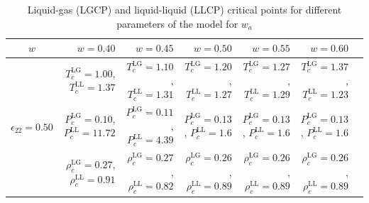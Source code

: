 \documentclass[9pt,twocolumn,twoside,lineno]{pnas-new}
\begin{document}
\begin{table}[h!]
\caption{Liquid-gas (LGCP) and liquid-liquid (LLCP) critical points for different parameters of the model for $w_a$}
\centering
\begin{tabular}{ |c||r|r|r|r|r|r| } 
 \hline
    $w$ & $w=0.40$ & $w = 0.45$ & $w = 0.50$ & $w = 0.55$ & $w = 0.60$ \\
    
  \hline
  \hline
 \multirow{3}{4em}{$\epsilon_{22}=0.50$}
 &   $T_c^\text{LG}=1.00$, $T_c^\text{LL}=1.37$  
 &   $T_c^\text{LG}=1.10$, $T_c^\text{LL}=1.31$  
 &   $T_c^\text{LG}=1.20$,  $T_c^\text{LL}=1.27$ 
 &   $T_c^\text{LG}=1.27$,  $T_c^\text{LL}=1.29$
 &   $T_c^\text{LG}=1.37$,  $T_c^\text{LL}=1.23$\\
 &  $P_c^\text{LG}=0.10$, $P_c^\text{LL}=11.72$ 
 & $P_c^\text{LG}=0.11$, $P_c^\text{LL}=4.39$  
 & $P_c^\text{LG}=0.13$, $P_c^\text{LL}=1.6$
 & $P_c^\text{LG}=0.13$, $P_c^\text{LL}=1.6$
 & $P_c^\text{LG}=0.13$, $P_c^\text{LL}=1.6$\\
 & $\rho_c^\text{LG}=0.27$, $\rho_c^\text{LL}=0.91$ &  $\rho_c^\text{LG}=0.27$, $\rho_c^\text{LL}=0.82$ &  $\rho_c^\text{LG}=0.26$, $\rho_c^\text{LL}=0.89$ & $\rho_c^\text{LG}=0.26$, $\rho_c^\text{LL}=0.89$ 
 & $\rho_c^\text{LG}=0.26$, $\rho_c^\text{LL}=0.89$ \\ 
 \hline
\end{tabular}
\label{Table4a}
\end{table}
\end{document}
